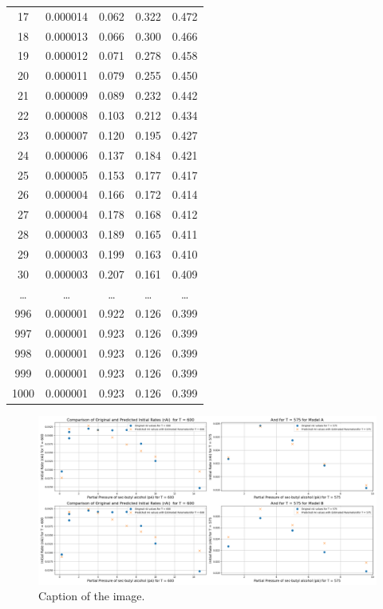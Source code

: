 \documentclass[a4paper,12pt]{article} %
\begin{document}
\begin{table}[ht]
\begin{tabular}{|c|c|c|c|c|}
            17 & 0.000014 & 0.062 & 0.322 & 0.472 \\
            18 & 0.000013 & 0.066 & 0.300 & 0.466 \\
            19 & 0.000012 & 0.071 & 0.278 & 0.458 \\
            20 & 0.000011 & 0.079 & 0.255 & 0.450 \\
            21 & 0.000009 & 0.089 & 0.232 & 0.442 \\
            22 & 0.000008 & 0.103 & 0.212 & 0.434 \\
            23 & 0.000007 & 0.120 & 0.195 & 0.427 \\
            24 & 0.000006 & 0.137 & 0.184 & 0.421 \\
            25 & 0.000005 & 0.153 & 0.177 & 0.417 \\
            26 & 0.000004 & 0.166 & 0.172 & 0.414 \\
            27 & 0.000004 & 0.178 & 0.168 & 0.412 \\
            28 & 0.000003 & 0.189 & 0.165 & 0.411 \\
            29 & 0.000003 & 0.199 & 0.163 & 0.410 \\
            30 & 0.000003 & 0.207 & 0.161 & 0.409 \\
            \ldots & \ldots & \ldots & \ldots & \ldots \\
            996 & 0.000001 & 0.922 & 0.126 & 0.399 \\
997 & 0.000001 & 0.923 & 0.126 & 0.399 \\
998 & 0.000001 & 0.923 & 0.126 & 0.399 \\
999 & 0.000001 & 0.923 & 0.126 & 0.399 \\
1000 & 0.000001 & 0.923 & 0.126 & 0.399 \\
\hline
\end{tabular}
\end{table}

\clearpage

\begin{figure}[ht]
    \centering
    \includegraphics[width=1\textwidth]{GNM_Q1_ParamComp.png}
    \caption{Caption of the image.}
\end{figure}
\end{document}
